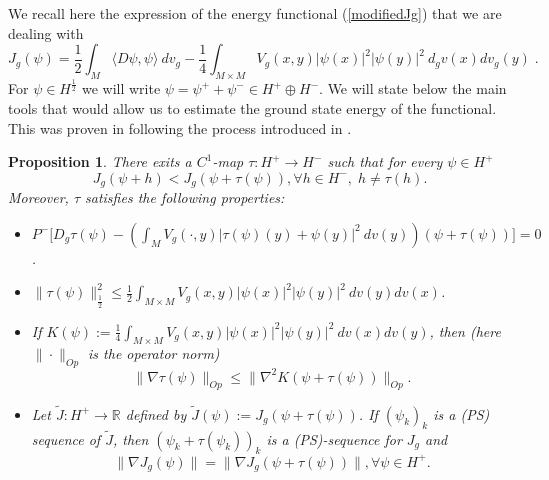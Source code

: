 \documentclass[11pt]{article}
\newtheorem{proposition}{Proposition}[section]
\def \R {\mathbb{R}}
\begin{document}
{\noindent
We recall here the expression of the energy functional (\ref{modifiedJg}) that we are dealing with
$$ J_{g}(\psi)=\frac{1}{2}\int_{M}\langle D \psi,\psi\rangle   \ dv_{g} -\frac{1}{4}\int_{M\times M} V_{g}(x,y)|\psi(x)|^{2} |\psi(y)|^{2} \ d_{g}v(x) dv_{g}(y) \; .$$
For $\psi\in H^{\frac{1}{2}}$ we will write $\psi = \psi^{+}+\psi^{-} \in H^{+}\oplus H^{-}$. We will state below the main tools that would allow us to estimate the ground state energy of the functional. This was proven in \cite{MMM} following the process introduced in \cite{YX1}.
\begin{proposition}\label{proptau}
There exits a $C^{1}$-map $\tau: H^{+}\to H^{-}$ such that for every $\psi \in H^{+}$ 
$$J_{g}(\psi+h)<J_{g}(\psi+\tau(\psi)), \forall h\in H^{-} , \; h\not=\tau(h).$$
Moreover, $\tau$ satisfies the following properties:
\begin{itemize}
\item[i)] $P^{-}\Big[D_{g}\tau(\psi)-\left(\displaystyle\int_{M}V_{g}(\cdot,y)|\tau(\psi)(y)+\psi(y)|^{2}\ dv(y) \right)(\psi+\tau(\psi))\Big]=0$.
\item[ii)] $\|\tau(\psi)\|_{\frac{1}{2}}^{2}\leq \displaystyle\frac{1}{2} \int_{M\times M}V_{g}(x,y) |\psi(x)|^{2} |\psi(y)|^{2}\ dv(y)dv(x)$.
\item[iii)] If $K(\psi):=\displaystyle\frac{1}{4} \int_{M\times M} V_{g}(x,y) |\psi(x)|^{2} |\psi(y)|^{2} \ dv(x)dv(y)$, then (here $\|\cdot\|_{Op}$ is the operator norm)
 $$\|\nabla \tau(\psi)\|_{Op}\leq \|\nabla^{2}K(\psi+\tau(\psi))\|_{Op}.$$
\item[iv)] Let $\tilde{J}:H^{+}\to \R$ defined by $\tilde{J}(\psi):=J_{g}(\psi+\tau(\psi))$. If $(\psi_{k})_{k}$ is a (PS) sequence of $\tilde{J}$, then $(\psi_{k}+\tau(\psi_{k}))_{k}$ is a (PS)-sequence for $J_{g}$ and
$$\|\nabla J_{g}(\psi)\|=\|\nabla J_{g}(\psi+\tau(\psi))\|, \forall \psi \in H^{+}.$$
\end{itemize}
\end{proposition}
 
}
\end{document}
